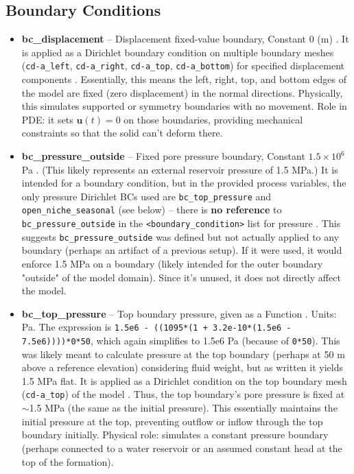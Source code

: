 \documentclass[10pt,a4paper]{article}
\begin{document}
\subsection*{Boundary Conditions}
\begin{itemize}
    \item \textbf{bc\_displacement} -- Displacement fixed-value boundary, Constant 0 (m) \cite{file:03_parameters_TRM}. It is applied as a Dirichlet boundary condition on multiple boundary meshes (\texttt{cd-a\_left}, \texttt{cd-a\_right}, \texttt{cd-a\_top}, \texttt{cd-a\_bottom}) for specified displacement components \cite{file:02_process_variables_TRM}. Essentially, this means the left, right, top, and bottom edges of the model are fixed (zero displacement) in the normal directions. Physically, this simulates supported or symmetry boundaries with no movement. Role in PDE: it sets $\mathbf{u}(t) = 0$ on those boundaries, providing mechanical constraints so that the solid can't deform there.

    \item \textbf{bc\_pressure\_outside} -- Fixed pore pressure boundary, Constant $1.5 \times 10^6$ Pa \cite{file:03_parameters_TRM}. (This likely represents an external reservoir pressure of 1.5 MPa.) It is intended for a boundary condition, but in the provided process variables, the only pressure Dirichlet BCs used are \texttt{bc\_top\_pressure} and \texttt{open\_niche\_seasonal} (see below) -- there is \textbf{no reference} to \texttt{bc\_pressure\_outside} in the \texttt{<boundary\_condition>} list for pressure \cite{file:02_process_variables_TRM, file:trm_proc_var_bc}. This suggests \texttt{bc\_pressure\_outside} was defined but not actually applied to any boundary (perhaps an artifact of a previous setup). If it were used, it would enforce 1.5 MPa on a boundary (likely intended for the outer boundary "outside" of the model domain). Since it's unused, it does not directly affect the model.

    \item \textbf{bc\_top\_pressure} -- Top boundary pressure, given as a Function \cite{file:03_parameters_TRM}. Units: Pa. The expression is \texttt{1.5e6 - ((1095*(1 + 3.2e-10*(1.5e6 - 7.5e6))))*0*50}, which again simplifies to 1.5e6 Pa (because of \texttt{0*50}). This was likely meant to calculate pressure at the top boundary (perhaps at 50 m above a reference elevation) considering fluid weight, but as written it yields 1.5 MPa flat. It is applied as a Dirichlet condition on the top boundary mesh (\texttt{cd-a\_top}) of the model \cite{file:02_process_variables_TRM}. Thus, the top boundary's pore pressure is fixed at $\sim$1.5 MPa (the same as the initial pressure). This essentially maintains the initial pressure at the top, preventing outflow or inflow through the top boundary initially. Physical role: simulates a constant pressure boundary (perhaps connected to a water reservoir or an assumed constant head at the top of the formation).


\end{itemize}
\end{document}
